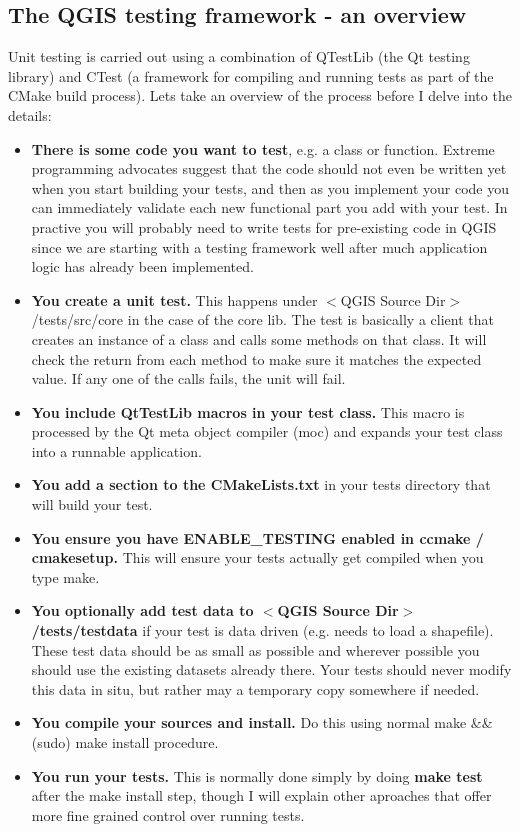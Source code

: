 \subsection{The QGIS testing framework  - an overview}
Unit testing is carried out using a combination of QTestLib (the Qt testing library) and 
CTest (a framework for compiling and running tests as part of the CMake build process). 
Lets take an overview of the process before I delve into the details:

\begin{itemize}
\item \textbf{There is some code you want to test}, e.g. a class or function. Extreme programming 
   advocates suggest that the code should not even be written yet when you start 
   building your tests, and then as you implement your code you can immediately validate 
   each new functional part you add with your test. In practive you will probably 
   need to write tests for pre-existing code in QGIS since we are starting with a testing 
   framework well after much application logic has already been implemented.

\item \textbf{You create a unit test.} This happens under $<$QGIS Source Dir$>$/tests/src/core 
   in the case of the core lib. The test is basically a client that creates an instance 
   of a class and calls some methods on that class. It will check the return from each 
   method to make sure it matches the expected value. If any one of the calls fails,
   the unit will fail.

\item \textbf{You include QtTestLib macros in your test class.} This macro is processed by 
   the Qt meta object compiler (moc) and expands your test class into a runnable application. 

\item \textbf{You add a section to the CMakeLists.txt} in your tests directory that will
   build your test.

\item \textbf{You ensure you have ENABLE\_TESTING enabled in ccmake / cmakesetup.} This 
   will ensure your tests actually get compiled when you type make.

\item \textbf{You optionally add test data to $<$QGIS Source Dir$>$/tests/testdata} if your 
   test is data driven (e.g. needs to load a shapefile). These test data should be 
   as small as possible and wherever possible you should use the existing datasets 
   already there. Your tests should never modify this data in situ, but rather 
   may a temporary copy somewhere if needed.

\item \textbf{You compile your sources and install.} Do this using normal make \&\& (sudo) 
   make install procedure.

\item \textbf{You run your tests.} This is normally done simply by doing \textbf{make test} 
 after the make install step, though I will explain other aproaches that offer more 
 fine grained control over running tests.
\end{itemize}

